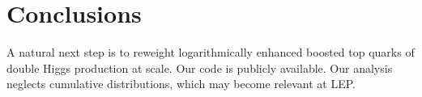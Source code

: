 \section{Conclusions}\label{sec:conclusions}

A natural next step is to reweight logarithmically enhanced boosted top
quarks of double Higgs production at scale. Our code is publicly
available. Our analysis neglects cumulative distributions, which may
become relevant at LEP.

